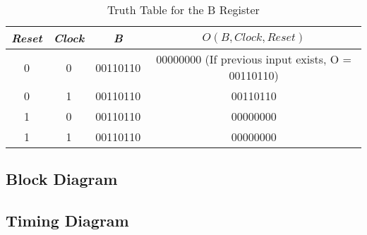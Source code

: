 	\begin{table}[H]
		\centering
		\begin{tabular}{|c|c|c|c|}
		\hline
		\hline
			\textit{Reset} & \textit{Clock} & \textit{B} & $O(B, Clock, Reset)$ \\ 
		\hline
		\hline
			0 & 0 & 00110110 & 00000000 (If previous input exists, O = 00110110) \\ 
			\hline
			0 & 1 & 00110110 & 00110110 \\ 
			\hline
			1 & 0 & 00110110 & 00000000 \\ 
			\hline
			1 & 1 & 00110110 & 00000000 \\ 
		\hline
		\hline
    		\end{tabular}
    		\caption{Truth Table for the B Register}
	\end{table}

\subsection{{Block Diagram}}

	{}

\subsection{{Timing Diagram}}

	{}
